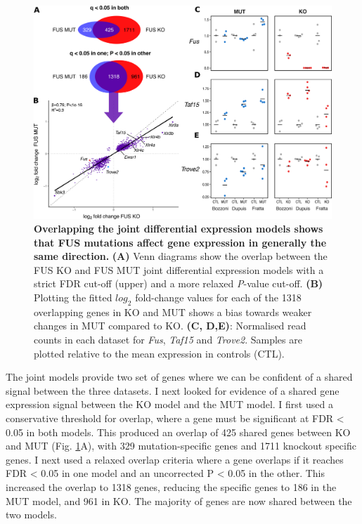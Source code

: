 
\begin{figure}[ht!]
	\centering
	\includegraphics[width=\textwidth]{Figures/06_fus_meta/expression_multi.png}
		\caption[Overlapping the joint differential expression models shows that FUS mutations affect gene expression in generally the same direction]{
		\textbf{Overlapping the joint differential expression models shows that FUS mutations affect gene expression in generally the same direction.}
		\textbf{(A)} Venn diagrams show the overlap between the FUS KO and FUS MUT joint differential expression models with a strict FDR cut-off (upper) and a more relaxed \textit{P}-value cut-off. 
		\textbf{(B)} Plotting the fitted $log_2$ fold-change values for each of the 1318 overlapping genes in KO and MUT shows a bias towards weaker changes in MUT compared to KO.
		\textbf{(C, D,E)}: Normalised read counts in each dataset for \textit{Fus}, \textit{Taf15} and \textit{Trove2}. Samples are plotted relative to the mean expression in controls (CTL).
	}
	\label{fig:fus_expression_multipanel}
\end{figure}

The joint models provide two set of genes where we can be confident of a shared signal between the three datasets.  
I next looked for evidence of a shared gene expression signal between the KO model and the MUT model.
I first used a conservative threshold for overlap, where a gene must be significant at FDR < 0.05 in both models. 
This produced an overlap of 425 shared genes between KO and MUT (Fig. \ref{fig:fus_expression_multipanel}A), with 329 mutation-specific genes and 1711 knockout specific genes.
I next used  a relaxed overlap criteria where a gene overlaps if it reaches FDR < 0.05 in one model and an uncorrected P < 0.05 in the other.
This increased the overlap to 1318 genes, reducing the specific genes to 186 in the MUT model, and 961 in KO.
The majority of genes are now shared between the two models.

